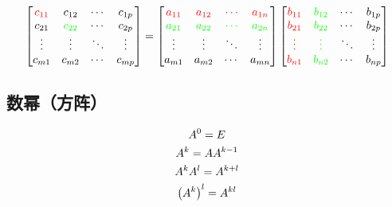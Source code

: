 \documentclass{article}
\begin{document}
\[\begin{bmatrix}
        \textcolor{red}{c_{11}} & c_{12}                    & \cdots & c_{1p} \\
        c_{21}                  & \textcolor{green}{c_{22}} & \cdots & c_{2p} \\
        \vdots                  & \vdots                    & \ddots & \vdots \\
        c_{m1}                  & c_{m2}                    & \cdots & c_{mp} \\
    \end{bmatrix}=
    \begin{bmatrix}
        \textcolor{red}{a_{11}}   & \textcolor{red}{a_{12}}   & \textcolor{red}{\cdots}   & \textcolor{red}{a_{1n}}   \\
        \textcolor{green}{a_{21}} & \textcolor{green}{a_{22}} & \textcolor{green}{\cdots} & \textcolor{green}{a_{2n}} \\
        \vdots                    & \vdots                    & \ddots                    & \vdots                    \\
        a_{m1}                    & a_{m2}                    & \cdots                    & a_{mn}                    \\
    \end{bmatrix}
    \begin{bmatrix}
        \textcolor{red}{b_{11}} & \textcolor{green}{b_{12}} & \cdots & b_{1p} \\
        \textcolor{red}{b_{21}} & \textcolor{green}{b_{22}} & \cdots & b_{2p} \\
        \textcolor{red}{\vdots} & \textcolor{green}{\vdots} & \ddots & \vdots \\
        \textcolor{red}{b_{n1}} & \textcolor{green}{b_{n2}} & \cdots & b_{np} \\
    \end{bmatrix}\]

\subsection{数幂（方阵）}

\[\begin{gathered}
        A^0=E\\
        A^k=AA^{k-1}\\
        A^kA^l=A^{k+l}\\
        \left(A^k\right)^l=A^{kl}
    \end{gathered}\]
\end{document}
